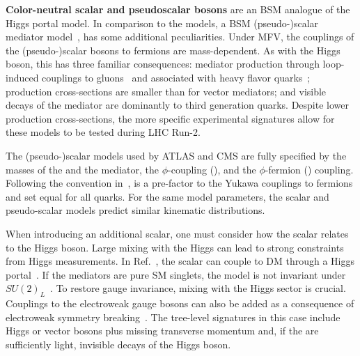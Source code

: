 \textbf{Color-neutral scalar and pseudoscalar bosons} are an BSM analogue of the Higgs portal model. In comparison to the \Zprime models, a BSM (pseudo-)scalar mediator model~\cite{Buckley:2014fba},  
has some additional peculiarities. 
Under MFV, the couplings of the (pseudo-)scalar bosons to fermions are mass-dependent. As with the Higgs boson, this has three familiar consequences: mediator production through loop-induced couplings to gluons~\cite{Haisch:2015ioa,Mattelaer:2015haa} and associated with heavy flavor quarks~\cite{Buckley:2014fba};
    production cross-sections are smaller than for vector mediators;
    and visible decays of the mediator are dominantly to third generation quarks. 
Despite lower production cross-sections, the more specific experimental signatures allow for these models to be tested during LHC Run-2.

The (pseudo-)scalar models used by ATLAS and CMS are fully specified by the masses of the \IP and the mediator, the $\phi$-\IP coupling (\gdm), and the $\phi$-fermion (\gq) coupling.
Following the convention in~\cite{Abercrombie:2015wmb}, \gq is a pre-factor to the Yukawa couplings to fermions and set equal for all quarks.
For the same model parameters, the scalar and pseudo-scalar models predict similar kinematic distributions.

When introducing an additional scalar, one must consider how the scalar relates to the Higgs boson. Large mixing with the Higgs can lead to strong constraints from Higgs measurements. In Ref.~\cite{Berlin:2014cfa}, the scalar can couple to DM through a Higgs portal~\cite{Berlin:2014cfa}. %
If the mediators are pure SM singlets, the model is not invariant under $SU(2)_L$~\cite{Bell:2016ekl}. 
To restore gauge invariance, mixing with the Higgs sector is crucial. 
Couplings to the electroweak gauge bosons can also be added as a consequence of electroweak symmetry breaking~\cite{Bauer:2016gys,Englert:2016joy}. The tree-level signatures in this case include Higgs or vector bosons plus missing transverse momentum and, if the \IP are sufficiently light, invisible decays of the Higgs boson.


